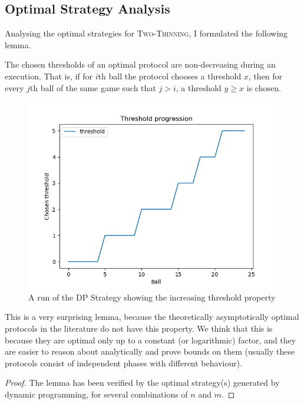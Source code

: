 \subsection{Optimal Strategy Analysis}

Analysing the optimal strategies for \textsc{Two-Thinning}, I formulated the following lemma.

\begin{lemma}\label{lemma: two-thinning-increasing-threshold}
The chosen thresholds of an optimal protocol are non-decreasing during an execution. That is, if for $i$th ball the protocol chooses a threshold $x$, then for every $j$th ball of the same game such that $j>i$, a threshold $y\geq x$ is chosen.
\end{lemma}


\begin{figure}[h!] \label{dp-increasing-threshold}
    \centering
    \includegraphics[scale=1.0]{Chapter4/Figs/dp_increasing_threshold.png}
    \caption{A run of the DP Strategy showing the increasing threshold property}
\end{figure}

This is a very surprising lemma, because the theoretically asymptotically optimal protocols in the literature do not have this property. We think that this is because they are optimal only up to a constant (or logarithmic) factor, and they are easier to reason about analytically and prove bounds on them (usually these protocols consist of independent phases with different behaviour).


\begin{proof}


The lemma has been verified by the optimal strategy(s) generated by dynamic programming, for several combinations of $n$ and $m$. 
\end{proof}


